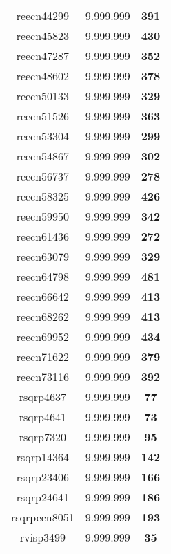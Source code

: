 \begin{tabular}{cc||c}
reecn44299       & 9.999.999        & {\bf 391}       \\ 
reecn45823       & 9.999.999        & {\bf 430}       \\ 
reecn47287       & 9.999.999        & {\bf 352}       \\ 
reecn48602       & 9.999.999        & {\bf 378}       \\ 
reecn50133       & 9.999.999        & {\bf 329}       \\ 
reecn51526       & 9.999.999        & {\bf 363}       \\ 
reecn53304       & 9.999.999        & {\bf 299}       \\ 
reecn54867       & 9.999.999        & {\bf 302}       \\ 
reecn56737       & 9.999.999        & {\bf 278}       \\ 
reecn58325       & 9.999.999        & {\bf 426}       \\ 
reecn59950       & 9.999.999        & {\bf 342}       \\ 
reecn61436       & 9.999.999        & {\bf 272}       \\ 
reecn63079       & 9.999.999        & {\bf 329}       \\ 
reecn64798       & 9.999.999        & {\bf 481}       \\ 
reecn66642       & 9.999.999        & {\bf 413}       \\ 
reecn68262       & 9.999.999        & {\bf 413}       \\ 
reecn69952       & 9.999.999        & {\bf 434}       \\ 
reecn71622       & 9.999.999        & {\bf 379}       \\ 
reecn73116       & 9.999.999        & {\bf 392}       \\ 
rsqrp4637        & 9.999.999        & {\bf 77}        \\ 
rsqrp4641        & 9.999.999        & {\bf 73}        \\ 
rsqrp7320        & 9.999.999        & {\bf 95}        \\ 
rsqrp14364       & 9.999.999        & {\bf 142}       \\ 
rsqrp23406       & 9.999.999        & {\bf 166}       \\ 
rsqrp24641       & 9.999.999        & {\bf 186}       \\ 
rsqrpecn8051     & 9.999.999        & {\bf 193}       \\ 
rvisp3499        & 9.999.999        & {\bf 35}        \\ 

\end{tabular}

